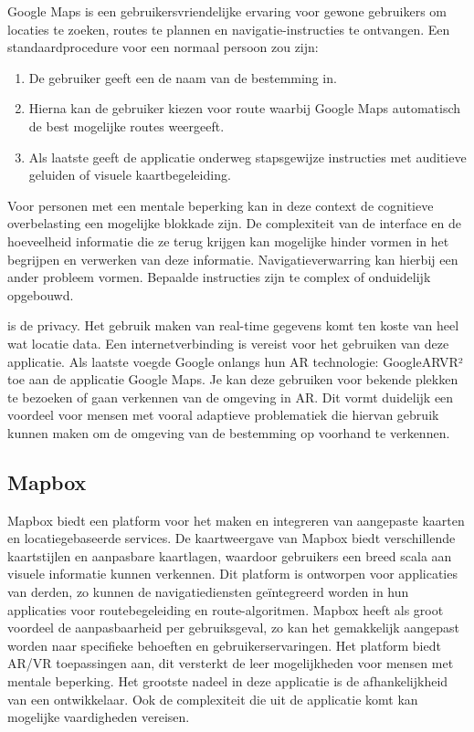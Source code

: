 Google Maps is een gebruikersvriendelijke ervaring voor gewone gebruikers om locaties te zoeken, routes te plannen en navigatie-instructies te ontvangen. Een standaardprocedure voor een normaal persoon zou zijn:

\begin{enumerate}
    \item De gebruiker geeft een de naam van de bestemming in.
    \item Hierna kan de gebruiker kiezen voor route waarbij Google Maps automatisch de best mogelijke routes weergeeft.
    \item Als laatste geeft de applicatie onderweg stapsgewijze instructies met auditieve geluiden of visuele kaartbegeleiding.
\end{enumerate}

Voor personen met een mentale beperking kan in deze context de cognitieve overbelasting een mogelijke blokkade zijn. De complexiteit van de interface en de hoeveelheid informatie die ze terug krijgen kan mogelijke hinder vormen in het begrijpen en verwerken van deze informatie. Navigatieverwarring kan hierbij een ander probleem vormen. Bepaalde instructies zijn te complex of onduidelijk opgebouwd.

is de privacy. Het gebruik maken van real-time gegevens komt ten koste van heel wat locatie data. Een internetverbinding is vereist voor het gebruiken van deze applicatie. Als laatste voegde Google onlangs hun AR technologie: GoogleARVR² toe aan de applicatie Google Maps. Je kan deze gebruiken voor bekende plekken te bezoeken of gaan verkennen van de omgeving in AR. Dit vormt duidelijk een voordeel voor mensen met vooral adaptieve problematiek die hiervan gebruik kunnen maken om de omgeving van de bestemming op voorhand te verkennen.

\subsection{Mapbox}
\label{sec:mapbox}

Mapbox biedt een platform voor het maken en integreren van aangepaste kaarten en locatiegebaseerde services. De kaartweergave van Mapbox biedt verschillende kaartstijlen en aanpasbare kaartlagen, waardoor gebruikers een breed scala aan visuele informatie kunnen verkennen. Dit platform is ontworpen voor applicaties van derden, zo kunnen de navigatiediensten geïntegreerd worden in hun applicaties voor routebegeleiding en route-algoritmen. Mapbox heeft als groot voordeel de aanpasbaarheid per gebruiksgeval, zo kan het gemakkelijk aangepast worden naar specifieke behoeften en gebruikerservaringen. Het platform biedt AR/VR toepassingen aan, dit versterkt de leer mogelijkheden voor mensen met mentale beperking. Het grootste nadeel in deze applicatie is de afhankelijkheid van een ontwikkelaar. Ook de complexiteit die uit de applicatie komt kan mogelijke vaardigheden vereisen.

